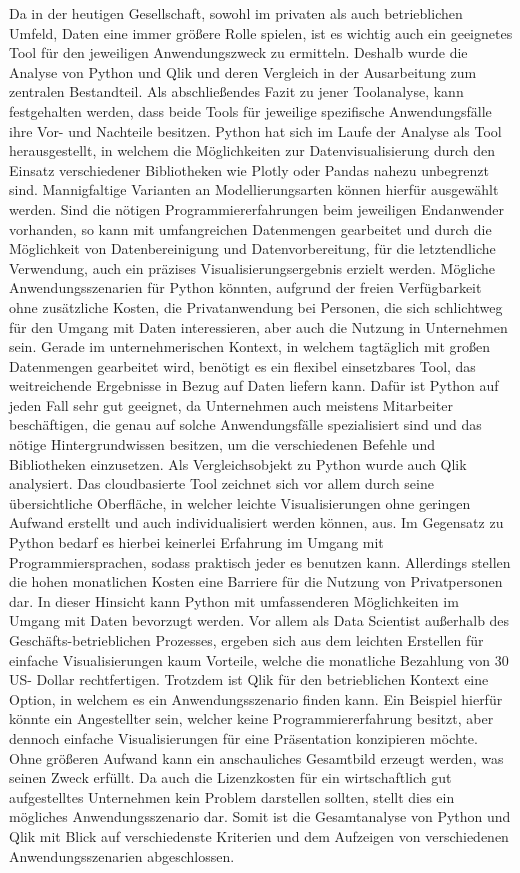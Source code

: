 \documentclass[12pt]{article}
\begin{document}
	Da in der heutigen Gesellschaft, sowohl im privaten als auch betrieblichen Umfeld,
	Daten eine immer größere Rolle spielen, ist es wichtig auch ein geeignetes Tool für den
	jeweiligen Anwendungszweck zu ermitteln.
	Deshalb wurde die Analyse von Python und Qlik und deren Vergleich in der Ausarbeitung
	zum zentralen Bestandteil.
	Als abschließendes Fazit zu jener Toolanalyse, kann festgehalten werden, dass beide
	Tools für jeweilige spezifische Anwendungsfälle ihre Vor- und Nachteile besitzen.
	Python hat sich im Laufe der Analyse als Tool herausgestellt, in welchem die
	Möglichkeiten zur Datenvisualisierung durch den Einsatz verschiedener Bibliotheken wie
	Plotly oder Pandas nahezu unbegrenzt sind.
	Mannigfaltige Varianten an Modellierungsarten können hierfür ausgewählt werden.
	Sind die nötigen Programmiererfahrungen beim jeweiligen Endanwender vorhanden, so
	kann mit umfangreichen Datenmengen gearbeitet und durch die Möglichkeit von
	Datenbereinigung und Datenvorbereitung, für die letztendliche Verwendung, auch ein
	präzises Visualisierungsergebnis erzielt werden.
	Mögliche Anwendungsszenarien für Python könnten, aufgrund der freien Verfügbarkeit
	ohne zusätzliche Kosten, die Privatanwendung bei Personen, die sich schlichtweg für
	den Umgang mit Daten interessieren, aber auch die Nutzung in Unternehmen sein.
	Gerade im unternehmerischen Kontext, in welchem tagtäglich mit großen Datenmengen
	gearbeitet wird, benötigt es ein flexibel einsetzbares Tool, das weitreichende Ergebnisse
	in Bezug auf Daten liefern kann. Dafür ist Python auf jeden Fall sehr gut geeignet, da
	Unternehmen auch meistens Mitarbeiter beschäftigen, die genau auf solche
	Anwendungsfälle spezialisiert sind und das nötige Hintergrundwissen besitzen, um die
	verschiedenen Befehle und Bibliotheken einzusetzen.
	Als Vergleichsobjekt zu Python wurde auch Qlik analysiert. Das cloudbasierte Tool
	zeichnet sich vor allem durch seine übersichtliche Oberfläche, in welcher leichte
	Visualisierungen ohne geringen Aufwand erstellt und auch individualisiert werden
	können, aus. Im Gegensatz zu Python bedarf es hierbei keinerlei Erfahrung im Umgang
	mit Programmiersprachen, sodass praktisch jeder es benutzen kann.
	Allerdings stellen die hohen monatlichen Kosten eine Barriere für die Nutzung von
	Privatpersonen dar. In dieser Hinsicht kann Python mit umfassenderen Möglichkeiten im
	Umgang mit Daten bevorzugt werden. Vor allem als Data Scientist außerhalb des
	Geschäfts-betrieblichen Prozesses, ergeben sich aus dem leichten Erstellen für
	einfache Visualisierungen kaum Vorteile, welche die monatliche Bezahlung von 30 US-
	Dollar rechtfertigen.
	Trotzdem ist Qlik für den betrieblichen Kontext eine Option, in welchem es ein
	Anwendungsszenario finden kann.
	Ein Beispiel hierfür könnte ein Angestellter sein, welcher keine Programmiererfahrung
	besitzt, aber dennoch einfache Visualisierungen für eine Präsentation konzipieren
	möchte. Ohne größeren Aufwand kann ein anschauliches Gesamtbild erzeugt werden,
	was seinen Zweck erfüllt.
	Da auch die Lizenzkosten für ein wirtschaftlich gut aufgestelltes Unternehmen kein
	Problem darstellen sollten, stellt dies ein mögliches Anwendungsszenario dar.
	Somit ist die Gesamtanalyse von Python und Qlik mit Blick auf verschiedenste Kriterien
	und dem Aufzeigen von verschiedenen Anwendungsszenarien abgeschlossen.
	
\end{document}
